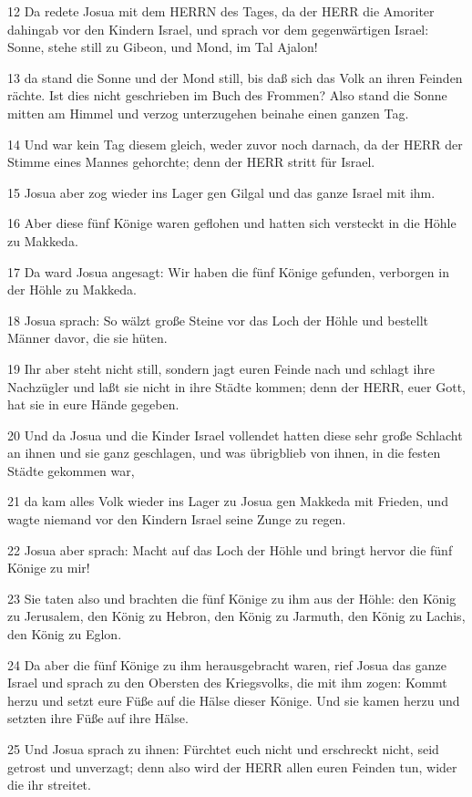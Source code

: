 \par 12 Da redete Josua mit dem HERRN des Tages, da der HERR die Amoriter dahingab vor den Kindern Israel, und sprach vor dem gegenwärtigen Israel: Sonne, stehe still zu Gibeon, und Mond, im Tal Ajalon!
\par 13 da stand die Sonne und der Mond still, bis daß sich das Volk an ihren Feinden rächte. Ist dies nicht geschrieben im Buch des Frommen? Also stand die Sonne mitten am Himmel und verzog unterzugehen beinahe einen ganzen Tag.
\par 14 Und war kein Tag diesem gleich, weder zuvor noch darnach, da der HERR der Stimme eines Mannes gehorchte; denn der HERR stritt für Israel.
\par 15 Josua aber zog wieder ins Lager gen Gilgal und das ganze Israel mit ihm.
\par 16 Aber diese fünf Könige waren geflohen und hatten sich versteckt in die Höhle zu Makkeda.
\par 17 Da ward Josua angesagt: Wir haben die fünf Könige gefunden, verborgen in der Höhle zu Makkeda.
\par 18 Josua sprach: So wälzt große Steine vor das Loch der Höhle und bestellt Männer davor, die sie hüten.
\par 19 Ihr aber steht nicht still, sondern jagt euren Feinde nach und schlagt ihre Nachzügler und laßt sie nicht in ihre Städte kommen; denn der HERR, euer Gott, hat sie in eure Hände gegeben.
\par 20 Und da Josua und die Kinder Israel vollendet hatten diese sehr große Schlacht an ihnen und sie ganz geschlagen, und was übrigblieb von ihnen, in die festen Städte gekommen war,
\par 21 da kam alles Volk wieder ins Lager zu Josua gen Makkeda mit Frieden, und wagte niemand vor den Kindern Israel seine Zunge zu regen.
\par 22 Josua aber sprach: Macht auf das Loch der Höhle und bringt hervor die fünf Könige zu mir!
\par 23 Sie taten also und brachten die fünf Könige zu ihm aus der Höhle: den König zu Jerusalem, den König zu Hebron, den König zu Jarmuth, den König zu Lachis, den König zu Eglon.
\par 24 Da aber die fünf Könige zu ihm herausgebracht waren, rief Josua das ganze Israel und sprach zu den Obersten des Kriegsvolks, die mit ihm zogen: Kommt herzu und setzt eure Füße auf die Hälse dieser Könige. Und sie kamen herzu und setzten ihre Füße auf ihre Hälse.
\par 25 Und Josua sprach zu ihnen: Fürchtet euch nicht und erschreckt nicht, seid getrost und unverzagt; denn also wird der HERR allen euren Feinden tun, wider die ihr streitet.

